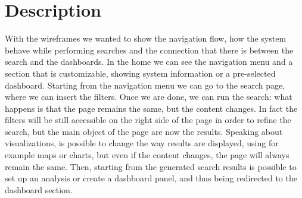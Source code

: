 \documentclass[../main.tex]{subfiles}
\begin{document}
    \section{Description}\label{sec:description2}
    With the wireframes we wanted to show the navigation flow, how the system behave while performing searches and the connection that there is between the search and the dashboards. In the home we can see the navigation menu and a section that is customizable, showing system information or a pre-selected dashboard. Starting from the navigation menu we can go to the search page, where we can insert the filters. Once we are done, we can run the search: what happens is that the page remains the same, but the content changes. In fact the filters will be still accessible on the right side of the page in order to refine the search, but the main object of the page are now the results. Speaking about visualizations, is possible to change the way results are displayed, using for example maps or charts, but even if the content changes, the page will always remain the same. Then, starting from the generated search results is possible to set up an analysis or create a dashboard panel, and thus being redirected to the dashboard section.
\end{document}
